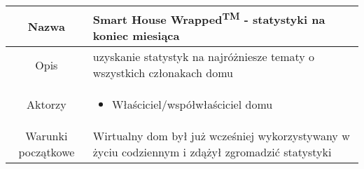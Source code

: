\documentclass{article}
\begin{document}
\begin{enumerate}
\begin{enumerate}
				\begin{table}[H]
					\centering
					\begin{tabular}{|c|p{7cm}|}
						\hline
						Nazwa                   & \textbf{Smart House Wrapped\textsuperscript{TM} - statystyki na koniec miesiąca}                                                                                                                                                                                                                                                                                                                                                                                                                                                                                                                          \\
						\hline
						Opis                    & uzyskanie statystyk na najróżniesze tematy o wszystkich członakach domu                                                                                                                                                                                                                                                                                                                                                                                                                                                                                                                                   \\
						\hline
						Aktorzy                 & \begin{itemize}\item Właściciel/współwłaściciel domu\end{itemize}                                                                                                                                                                                                                                                                                                                                                                                                                                                                                                                                         \\
						\hline
						Warunki początkowe      & Wirtualny dom był już wcześniej wykorzystywany w życiu codziennym i zdążył zgromadzić statystyki                                                                                                                                                                                                                                                                                                                                                                                                                                                                                                          \\

\end{tabular}
\end{table}
\end{enumerate}
\end{enumerate}
\end{document}
